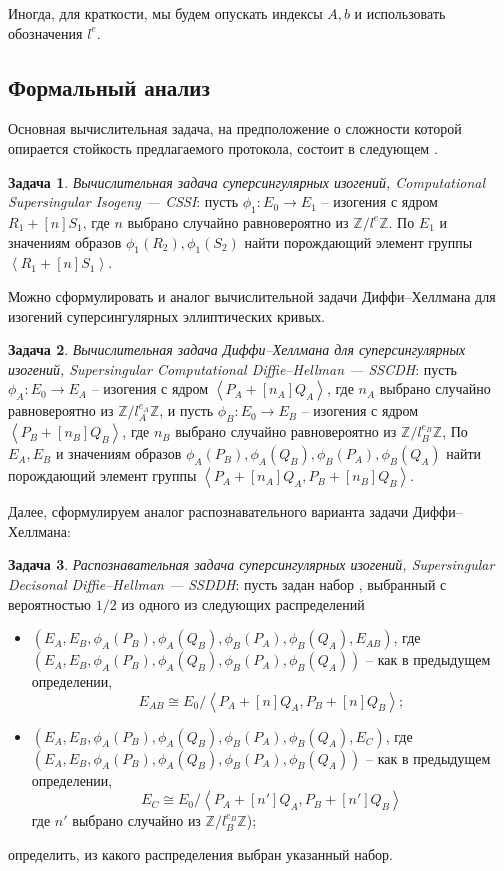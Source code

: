 \documentclass[a4paper,12pt]{article}
\newcommand{\ZZ}{\mathbb{Z}}
\newcommand{\tr}[1]{\left\langle #1\right\rangle}
\theoremstyle{definition}
\newtheorem{problem}{Задача}
\begin{document}
Иногда, для краткости, мы будем опускать индексы $A, b$ и использовать обозначения $l^e$.

\subsection{Формальный анализ}

Основная вычислительная задача, на предположение о сложности которой опирается стойкость предлагаемого протокола, состоит в следующем \cite{DF}.

\begin{problem}\label{problem31} \emph{Вычислительная задача суперсингулярных изогений, Computational Supersingular Isogeny --- CSSI}: пусть $\phi_1: E_0 \to E_1$ -- изогения с ядром
$R_1 + [n]S_1$, где   $n $ выбрано случайно равновероятно из $\ZZ/l^{e}\ZZ$. По $E_1$ и значениям образов $\phi_1(R_2), \phi_1(S_2)$ найти порождающий элемент группы $\tr{R_1+[n]S_1}$.
\end{problem}

Можно сформулировать и аналог вычислительной задачи Диффи--Хеллмана для изогений суперсингулярных эллиптических кривых.

\begin{problem}\label{problem32} \emph{Вычислительная задача Диффи--Хеллмана для суперсингулярных изогений, Supersingular Computational Diffie--Hellman ---  SSCDH}: 
пусть $\phi_A: E_0 \to E_A$ -- изогения с ядром $\tr{P_A+[n_A]Q_A}$, где   $n_A $ выбрано случайно равновероятно из $\ZZ/l_A^{e_A}\ZZ$,
и пусть $\phi_B: E_0 \to E_B$ -- изогения с ядром $\tr{P_B+[n_B]Q_B}$, где   $n_B $ выбрано случайно равновероятно из $\ZZ/l_B^{e_B}\ZZ$,
По $E_A,E_B$ и значениям образов $\phi_A(P_B), \phi_A(Q_B), \phi_B(P_A), \phi_B(Q_A)$ найти порождающий элемент группы $\tr{P_A+[n_A]Q_A, P_B+[n_B]Q_B}$.
\end{problem}

Далее, сформулируем аналог распознавательного варианта задачи Диффи--Хеллмана: 

 \begin{problem}\label{problem8} \emph{Распознавательная задача суперсингулярных изогений, Supersingular Decisonal Diffie--Hellman --- SSDDH}: пусть задан набор , выбранный с вероятностью $1/2$ из одного из следующих распределений
\begin{itemize}
\item $(E_A,E_B,\phi_A(P_B), \phi_A(Q_B), \phi_B(P_A), \phi_B(Q_A),E_{AB})$, где\\ $(E_A,E_B,\phi_A(P_B), \phi_A(Q_B), \phi_B(P_A), \phi_B(Q_A))$ -- как в предыдущем определении,
$$
E_{AB} \cong E_0/\tr{P_A+[n]Q_A, P_B+[n]Q_B};
$$
\item $(E_A,E_B,\phi_A(P_B), \phi_A(Q_B), \phi_B(P_A), \phi_B(Q_A),E_{C})$, где\\  $(E_A,E_B,\phi_A(P_B), \phi_A(Q_B), \phi_B(P_A), \phi_B(Q_A))$ --  как в предыдущем определении,  
$$
E_C \cong E_0/\tr{P_A+[n']Q_A, P_B+[n']Q_B}
$$
где $ n'$ выбрано случайно из $\ZZ/l_B^{e_B}\ZZ$);
\end{itemize}
определить, из какого распределения выбран указанный набор. 
\end{problem}
\end{document}
